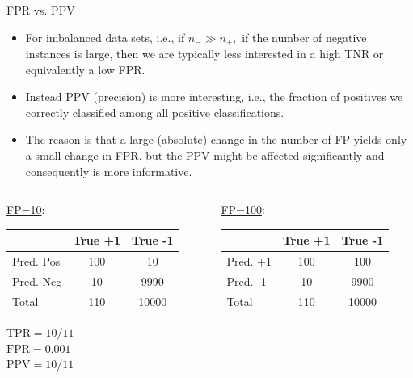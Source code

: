 \documentclass[11pt,compress,t,notes=noshow, xcolor=table]{beamer}
\newcommand{\np}{n_{+}} %
\newcommand{\nn}{n_{-}} %
\begin{document}
	\begin{frame}{FPR vs. PPV}
			\small	
		\begin{itemize}
%			
			\item For imbalanced data sets, i.e., if $\nn \gg \np,$ if the number of negative instances is large, then we are typically less interested in a high TNR or equivalently a low FPR.
%			
			\item Instead PPV (precision) is more interesting, i.e., the fraction of positives we correctly classified among all positive classifications. 
%			
			\item The reason is that a large (absolute) change in the number of FP yields only a small change in FPR, but the PPV might be affected significantly and consequently is more informative.
%			
		\end{itemize}
	
		
		\begin{columns}
			\footnotesize
			\begin{column}{0.45\textwidth}
				\centering
				\underline{FP=10}:\\
				\lz
				{
					\tiny
					\centering
					\tiny
					\begin{tabular}{|l|c|c|}
						\hline
						& True +1 & True -1 \\ \hline
						Pred. Pos & 100            & 10            \\ \hline
						Pred. Neg & 10            & 9990           \\ \hline
						Total  & 110            & 10000           \\ \hline
					\end{tabular}
				}
				
				\medskip
				$\text{TPR} = 10/11$\\
				$\text{FPR} = 0.001$\\
				$\text{PPV} = 10/11$
			\end{column}
			\begin{column}{0.45\textwidth}
				\centering
				\underline{FP=100}:\\
				\lz
				{
					\tiny
					\begin{tabular}{|l|c|c|}
						\hline
						& True +1 & True -1 \\ \hline
						Pred. +1 & 100            & 100            \\ \hline
						Pred. -1 & 10            & 9900           \\ \hline
						Total  & 110            & 10000           \\ \hline
					\end{tabular}
				}
				

\end{column}
\end{columns}
\end{frame}
\end{document}

